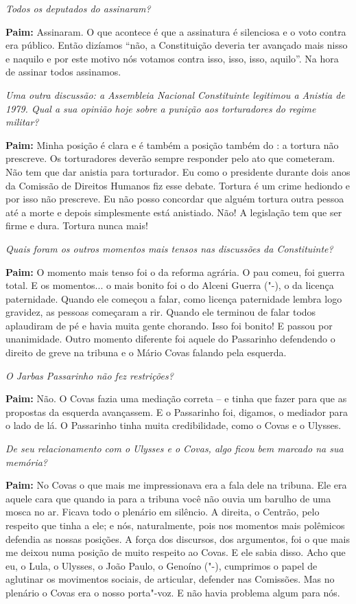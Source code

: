 \emph{Todos os deputados do  assinaram?}

\textbf{Paim:} Assinaram. O que acontece é que a assinatura é silenciosa
e o voto contra era público. Então dizíamos ``não, a Constituição
deveria ter avançado mais nisso e naquilo e por este motivo nós votamos
contra isso, isso, isso, aquilo''. Na hora de assinar todos assinamos.

\emph{Uma outra discussão: a Assembleia Nacional Constituinte
legitimou a Anistia de 1979. Qual a sua opinião hoje sobre a punição aos
torturadores do regime militar?}

\textbf{Paim:} Minha posição é clara e é também a posição também do :
a tortura não prescreve. Os torturadores deverão sempre responder pelo
ato que cometeram. Não tem que dar anistia para torturador. Eu como o
presidente durante dois anos da Comissão de Direitos Humanos fiz esse
debate. Tortura é um crime hediondo e por isso não prescreve. Eu não
posso concordar que alguém tortura outra pessoa até a morte e depois
simplesmente está anistiado. Não! A legislação tem que ser firme e dura.
Tortura nunca mais!

\emph{Quais foram os outros momentos mais tensos nas discussões da
Constituinte?}

\textbf{Paim:} O momento mais tenso foi o da reforma agrária. O pau
comeu, foi guerra total. E os momentos... o mais bonito foi o do Alceni
Guerra ("-), o da licença paternidade. Quando ele começou a falar,
como licença paternidade lembra logo gravidez, as pessoas começaram a
rir. Quando ele terminou de falar todos aplaudiram de pé e havia muita
gente chorando. Isso foi bonito! E passou por unanimidade. Outro momento
diferente foi aquele do Passarinho defendendo o direito de greve na
tribuna e o Mário Covas falando pela esquerda.

\emph{O Jarbas Passarinho não fez restrições?}

\textbf{Paim:} Não. O Covas fazia uma mediação correta -- e tinha que
fazer para que as propostas da esquerda avançassem. E o Passarinho foi,
digamos, o mediador para o lado de lá. O Passarinho tinha muita
credibilidade, como o Covas e o Ulysses.

\emph{De seu relacionamento com o Ulysses e o Covas, algo ficou bem
marcado na sua memória?}

\textbf{Paim:} No Covas o que mais me impressionava era a fala dele na
tribuna. Ele era aquele cara que quando ia para a tribuna você não ouvia
um barulho de uma mosca no ar. Ficava todo o plenário em silêncio. A
direita, o Centrão, pelo respeito que tinha a ele; e nós, naturalmente,
pois nos momentos mais polêmicos defendia as nossas posições. A força
dos discursos, dos argumentos, foi o que mais me deixou numa posição de
muito respeito ao Covas. E ele sabia disso. Acho que eu, o Lula, o
Ulysses, o João Paulo, o Genoíno ("-), cumprimos o papel de aglutinar
os movimentos sociais, de articular, defender nas Comissões. Mas no
plenário o Covas era o nosso porta"-voz. E não havia problema algum para
nós.

